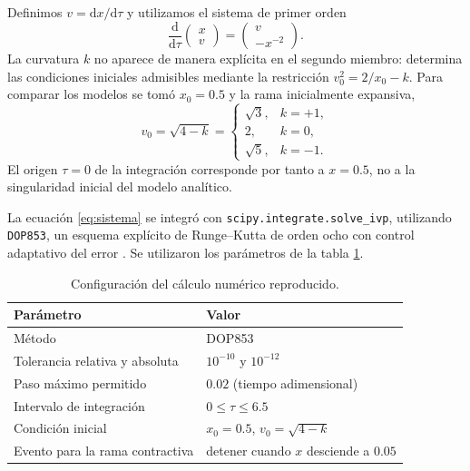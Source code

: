 \documentclass[letterpaper,11pt]{article}
\newcommand{\td}{\mathrm{d}}
\begin{document}
Definimos $v=\td x/\td\tau$ y utilizamos el sistema de primer orden
\begin{equation}
\boxed{\frac{\td}{\td\tau}\begin{pmatrix}x\\v\end{pmatrix}
=\begin{pmatrix}v\\-x^{-2}\end{pmatrix}.}
\label{eq:sistema}
\end{equation}
La curvatura $k$ no aparece de manera explícita en el segundo miembro: determina las condiciones iniciales admisibles mediante la restricción $v_0^2=2/x_0-k$. Para comparar los modelos se tomó $x_0=0.5$ y la rama inicialmente expansiva,
\begin{equation}
v_0=\sqrt{4-k}=\begin{cases}
\sqrt3,&k=+1,\\
2,&k=0,\\
\sqrt5,&k=-1.
\end{cases}
\label{eq:condiciones}
\end{equation}
El origen $\tau=0$ de la integración corresponde por tanto a $x=0.5$, no a la singularidad inicial del modelo analítico.

La ecuación \eqref{eq:sistema} se integró con \texttt{scipy.integrate.solve\_ivp}, utilizando \texttt{DOP853}, un esquema explícito de Runge--Kutta de orden ocho con control adaptativo del error \cite{scipyivp,virtanen2020}. Se utilizaron los parámetros de la tabla \ref{tab:parametros}.

\begin{table}[htbp]
\centering\small
\caption{Configuración del cálculo numérico reproducido.}
\label{tab:parametros}
\begin{tabular}{@{}ll@{}}
\toprule
Parámetro & Valor \\
\midrule
Método & DOP853 \\
Tolerancia relativa y absoluta & $10^{-10}$ y $10^{-12}$ \\
Paso máximo permitido & $0.02$ (tiempo adimensional) \\
Intervalo de integración & $0\leq\tau\leq6.5$ \\
Condición inicial & $x_0=0.5$, $v_0=\sqrt{4-k}$ \\
Evento para la rama contractiva & detener cuando $x$ desciende a $0.05$ \\
\bottomrule
\end{tabular}
\end{table}
\end{document}
